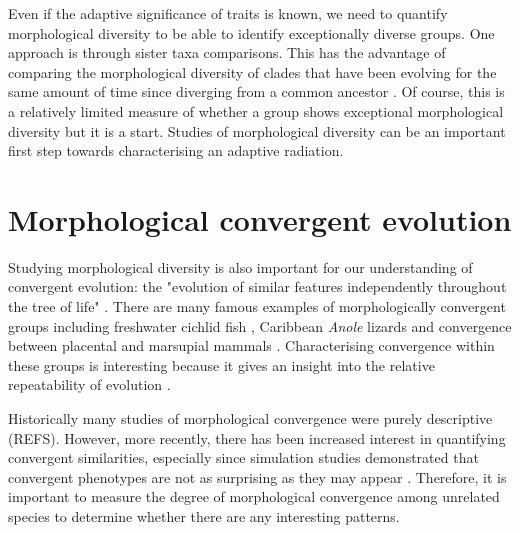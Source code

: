 	
	Even if the adaptive significance of traits is known, we need to quantify morphological diversity to be able to identify exceptionally diverse groups. One approach is through sister taxa comparisons. This has the advantage of comparing the morphological diversity of clades that have been evolving for the same amount of time since diverging from a common ancestor \citep{Losos2002}. Of course, this is a relatively limited measure of whether a group shows exceptional morphological diversity but it is a start.
	Studies of morphological diversity can be an important first step towards characterising an adaptive radiation.
\section{Morphological convergent evolution}

	Studying morphological diversity is also important for our understanding of convergent evolution: the "evolution of similar features independently throughout the tree of life" \citep[Futuyma 1998, cited in][]{Losos2011}. There are many famous examples of morphologically convergent groups including freshwater cichlid fish \citep{Muschick2012}, Caribbean \textit{Anole} lizards \citep{Mahler2013} and convergence between placental and marsupial mammals \citep{Wroe2007}. Characterising convergence within these groups is interesting because it gives an insight into the relative repeatability of evolution \citep{Losos2011}.

	Historically many studies of morphological convergence were purely descriptive (REFS). However, more recently, there has been increased interest in quantifying convergent similarities, especially since simulation studies demonstrated that convergent phenotypes are not as surprising as they may appear \citep{Stayton2008}. Therefore, it is important to measure the degree of morphological convergence among unrelated species to determine whether there are any interesting patterns.
	
